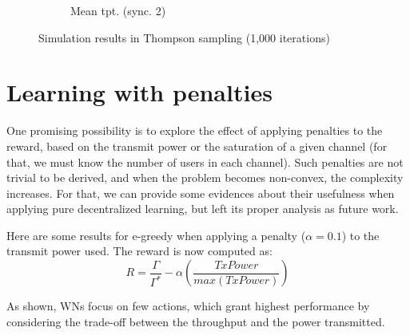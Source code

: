 \documentclass[preprint,12pt]{article}
\begin{document}
\begin{figure}[h!]
\begin{subfigure}[b]{.3\textwidth}
		\caption{Mean tpt. (sync. 2)}\label{fig:mean_tpt_CTS}
	\end{subfigure}
	\caption{Simulation results in Thompson sampling (1,000 iterations)}
	\label{fig:ts}
\end{figure}

\section{Learning with penalties}
One promising possibility is to explore the effect of applying penalties to the reward, based on the transmit power or the saturation of a given channel (for that, we must know the number of users in each channel). Such penalties are not trivial to be derived, and when the problem becomes non-convex, the complexity increases. For that, we can provide some evidences about their usefulness when applying pure decentralized learning, but left its proper analysis as future work.

Here are some results for e-greedy when applying a penalty ($\alpha = 0.1$) to the transmit power used. The reward is now computed as:
\begin{equation}
	R = \frac{\Gamma}{\Gamma^*} - \alpha (\frac{TxPower}{max(TxPower)})
\end{equation}

As shown, WNs focus on few actions, which grant highest performance by considering the trade-off between the throughput and the power transmitted.
\end{document}
